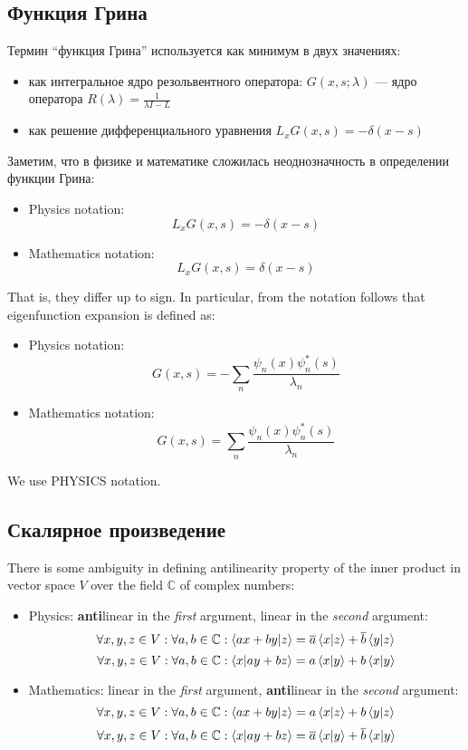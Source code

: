 \subsection{Функция Грина}
Термин ``функция Грина'' используется как минимум в двух значениях:

\begin{itemize}
\item как интегральное ядро резольвентного оператора: $G(x, s; \lambda)$ — ядро оператора $R(\lambda) = \frac{1}{\lambda I - L}$
\item как решение дифференциального уравнения $L_x G(x, s) = -\delta(x - s)$
\end{itemize}

Заметим, что в физике и математике сложилась неоднозначность в определении функции Грина:


\begin{itemize}
\item Physics notation: $$L_x G(x, s) = -\delta(x - s)$$
\item Mathematics notation: $$L_x G(x, s) = \delta(x - s)$$
\end{itemize} 

That is, they differ up to sign. In particular, from the notation follows that eigenfunction expansion is defined as: 

\begin{itemize}
\item Physics notation: $$G(x, s) = -\sum\limits_n \frac{\psi_n(x) \psi_n^*(s)}{\lambda_n}$$
\item Mathematics notation: $$G(x, s) = \sum\limits_n \frac{\psi_n(x) \psi_n^*(s)}{\lambda_n}$$
\end{itemize} 

We use PHYSICS notation.

\subsection{Скалярное произведение}
There is some ambiguity in defining antilinearity property of the inner product in vector space $V$ over the field $\mathbb{C}$ of complex numbers:

\begin{itemize}
\item Physics: \textbf{anti}linear in the \textit{first} argument, linear in the \textit{second} argument:
\[
\forall x, y, z \in V: \forall a, b \in \mathbb{C}: \ip{ax + by}{z} = \cconj{a} \ip{x}{z} + \cconj{b} \ip{y}{z}
\]
\[
\forall x, y, z \in V: \forall a, b \in \mathbb{C}: \ip{x}{ay + bz} = a \ip{x}{y} + b \ip{x}{y}
\]
\item Mathematics: linear in the \textit{first} argument, \textbf{anti}linear in the \textit{second} argument:
\[
\forall x, y, z \in V: \forall a, b \in \mathbb{C}: \ip{ax + by}{z} = a \ip{x}{z} + b \ip{y}{z}
\]
\[
\forall x, y, z \in V: \forall a, b \in \mathbb{C}: \ip{x}{ay + bz} = \cconj{a} \ip{x}{y} + \cconj{b} \ip{x}{y}
\]
\end{itemize}

